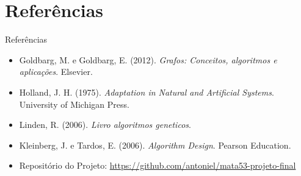 \documentclass[aspectratio=169,xcolor=table]{beamer}
\begin{document}
\section{Referências}
\begin{frame}{Referências}
    \begin{itemize}
        \item Goldbarg, M. e Goldbarg, E. (2012). \emph{Grafos: Conceitos, algoritmos e aplicações}. Elsevier. \cite{goldbarg2012}
        \item Holland, J. H. (1975). \emph{Adaptation in Natural and Artificial Systems}. University of Michigan Press. \cite{Holland1975}
        \item Linden, R. (2006). \emph{Livro algoritmos geneticos}. \cite{Linden2006}
        \item Kleinberg, J. e Tardos, E. (2006). \emph{Algorithm Design}. Pearson Education. \cite{kleinberg2006algorithm}
        \item Repositório do Projeto: \url{https://github.com/antoniel/mata53-projeto-final}
    \end{itemize}
\end{frame}
\end{document}
